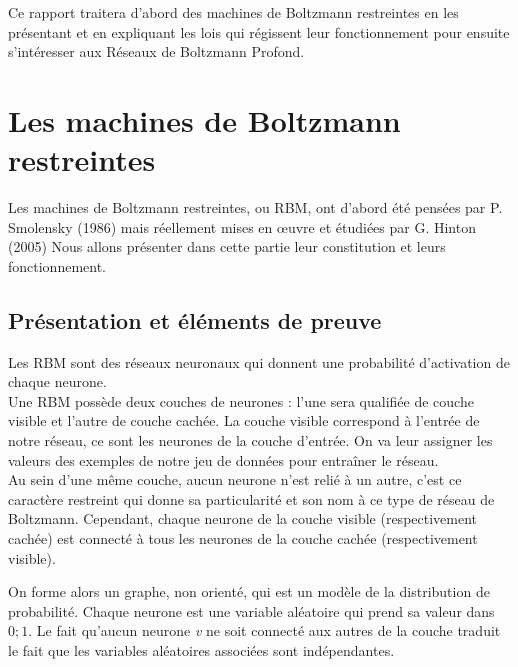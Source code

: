 \documentclass[a4paper,oneside]{report}
\begin{document}
            Ce rapport traitera d'abord des machines de Boltzmann restreintes en les
            présentant et en expliquant les lois qui régissent leur fonctionnement pour
            ensuite s'intéresser aux Réseaux de Boltzmann Profond.

        \chapter{Les machines de Boltzmann restreintes}

            Les machines de Boltzmann restreintes, ou RBM, ont d'abord été
            pensées par P. Smolensky (1986) mais réellement mises en œuvre et
            étudiées par G.
            Hinton (2005) Nous allons présenter dans cette partie leur constitution et
            leurs fonctionnement.

            \section{Présentation et éléments de preuve}

                Les RBM sont des réseaux neuronaux qui donnent une
                probabilité d'activation de chaque neurone.\\

                Une RBM possède deux couches de neurones : l'une sera qualifiée 
                de couche visible et l'autre de couche cachée.
                La couche visible correspond à l'entrée de notre réseau, ce sont
                les neurones de la couche d'entrée. On va leur assigner les
                valeurs des exemples de notre jeu de données pour entraîner le
                réseau.\\

                Au sein d'une même couche, aucun neurone n'est relié à un
                autre, c'est ce caractère restreint qui donne sa particularité 
                et son nom à ce type de réseau de Boltzmann.
                Cependant, chaque neurone de la couche visible (respectivement
                cachée) est connecté à tous les neurones de la couche cachée 
                (respectivement visible). 
                
                On forme alors un graphe, non orienté, qui est un
                modèle de la distribution de probabilité. Chaque neurone est une variable aléatoire
                qui prend sa valeur dans \begin{math}{0;1}\end{math}. Le fait
                qu'aucun neurone \textit{v} ne soit connecté aux autres de la
                couche traduit le fait que les variables aléatoires associées
                sont indépendantes.
                
\end{document}
